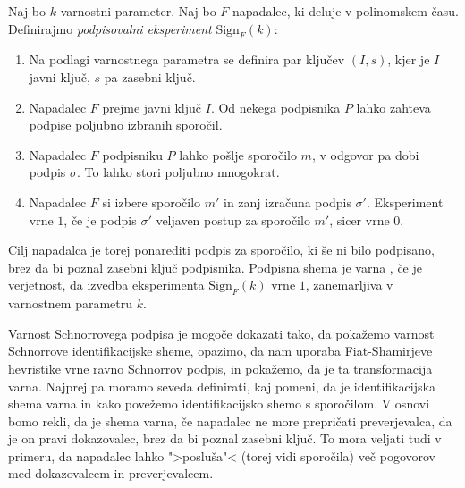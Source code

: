 \documentclass[isrm2, tisk]{fmfdelo}
\begin{document}
\begin{definicija}
    Naj bo $k$ varnostni parameter. Naj bo $F$ napadalec, ki deluje v polinomskem času. Definirajmo
    \textit{podpisovalni eksperiment} $\text{Sign}_F(k)$:
    \begin{enumerate}
        \item Na podlagi varnostnega parametra se definira par ključev $(I, s)$, kjer je $I$
            javni ključ, $s$ pa zasebni ključ.
        \item Napadalec $F$ prejme javni ključ $I$. Od nekega podpisnika $P$ lahko zahteva podpise
            poljubno izbranih sporočil.
        \item Napadalec $F$ podpisniku $P$ lahko pošlje sporočilo $m$, v odgovor pa dobi podpis $\sigma$.
            To lahko stori poljubno mnogokrat.
        \item Napadalec $F$ si izbere sporočilo $m'$ in zanj izračuna podpis $\sigma'$. Eksperiment
            vrne $1$, če je podpis $\sigma'$ veljaven postup za sporočilo $m'$, sicer vrne $0$.
    \end{enumerate}
    Cilj napadalca je torej ponarediti podpis za sporočilo, ki še ni bilo podpisano, brez da bi poznal
    zasebni ključ podpisnika. Podpisna shema je varna , če je verjetnost, da izvedba eksperimenta
    $\text{Sign}_F(k)$ vrne $1$, zanemarljiva v varnostnem parametru $k$.
\end{definicija}

Varnost Schnorrovega podpisa je mogoče dokazati tako, da pokažemo varnost Schnorrove identifikacijske
sheme, opazimo, da nam uporaba Fiat-Shamirjeve hevristike vrne ravno Schnorrov podpis, in pokažemo, da
je ta transformacija varna. Najprej pa moramo seveda definirati, kaj pomeni, da je identifikacijska
shema varna in kako povežemo identifikacijsko shemo s sporočilom. V osnovi bomo rekli, da je shema
varna, če napadalec ne more prepričati preverjevalca, da je on pravi dokazovalec, brez da bi poznal
zasebni ključ. To mora veljati tudi v primeru, da napadalec lahko ">posluša"< (torej vidi sporočila)
več pogovorov med dokazovalcem in preverjevalcem.
\end{document}
